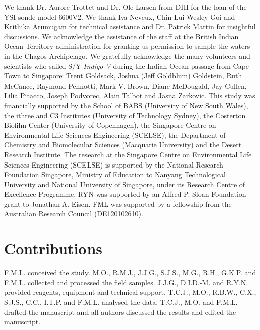 \begin{refsection}
We thank Dr. Aurore Trottet and Dr. Ole Larsen from DHI for the loan of the YSI sonde model 6600V2. We thank Iva Neveux, Chin Lui Wesley Goi and Krithika Arumugam for technical assistance and Dr. Patrick Martin for insightful discussions. We acknowledge the assistance of the staff at the British Indian Ocean Territory administration for granting us permission to sample the waters in the Chagos Archipelago. We gratefully acknowledge the many volunteers and scientists who sailed S/Y {\em Indigo V} during the Indian Ocean passage from Cape Town to Singapore: Trent Goldsack, Joshua (Jeff Goldblum) Goldstein, Ruth McCance, Raymond Pennotti, Mark V. Brown, Diane McDougald, Jay Cullen, Lilia Pitacco, Joseph Podvorec, Alain Talbot and Jasna Zarkovic. This study was financially supported by the School of BABS (University of New South Wales), the ithree and C3 Institutes (University of Technology Sydney), the Costerton Biofilm Center (University of Copenhagen), the Singapore Centre on Environmental Life Sciences Engineering (SCELSE), the Department of Chemistry and Biomolecular Sciences (Macquarie University) and the Desert Research Institute. The research at the Singapore Centre on Environmental Life Sciences Engineering (SCELSE) is supported by the National Research Foundation Singapore, Ministry of Education to Nanyang Technological University and National University of Singapore, under its Research Centre of Excellence Programme. RYN was supported by an Alfred P. Sloan Foundation grant to Jonathan A. Eisen. FML was supported by a fellowship from the Australian Research Council (DE120102610).

\section{Contributions}

F.M.L. conceived the study. M.O., R.M.J., J.J.G., S.J.S., M.G., R.H., G.K.P. and F.M.L. collected and processed the field samples. J.J.G., D.I.D.-M. and R.Y.N. provided reagents, equipment and technical support. T.C.J., M.O., R.B.W., C.X., S.J.S., C.C., I.T.P. and F.M.L. analysed the data. T.C.J., M.O. and F.M.L. drafted the manuscript and all authors discussed the results and edited the manuscript.

\printbibliography[heading=subbibliography]

\end{refsection}
